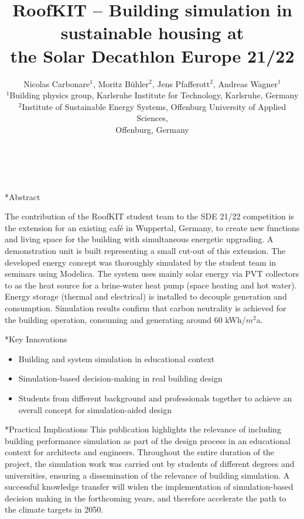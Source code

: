 \documentclass[twocolumn, a4paper,10pt]{article}
\title{%
RoofKIT – Building simulation in sustainable housing at \\%
\vspace{4pt}
the Solar Decathlon Europe 21/22} %
\author{%
Nicolas Carbonare$^1$, Moritz Bühler$^2$, Jens Pfafferott$^2$, Andreas Wagner$^1$\\ %
$^1$Building physics group, Karlsruhe Institute for Technology, Karlsruhe, Germany\\ %
$^2$Institute of Sustainable Energy Systems, Offenburg University of Applied Sciences,\\%
Offenburg, Germany\\ %
\phantom{Line 8}\\ %
\phantom{Line 9}\\} %
\date{\vspace{-0.5cm}}	%
\makeatletter
\renewcommand\section{\@startsection{section}{1}{\z@}{3pt}{3pt}{\normalfont\large\bfseries}}
\makeatother
\begin{document}
\maketitle
\section*{Abstract}	%
\addtocounter{section}{1}
The contribution of the RoofKIT student team to the SDE 21/22 competition is the extension for an existing café in Wuppertal, Germany, to create new functions and living space for the building with simultaneous energetic upgrading. A demonstration unit is built representing a small cut-out of this extension. The developed energy concept was thoroughly simulated by the student team in seminars using Modelica. The system uses mainly solar energy via PVT collectors to as the heat source for a brine-water heat pump (space heating and hot water). Energy storage (thermal and electrical) is installed to decouple generation and consumption. Simulation results confirm that carbon neutrality is achieved for the building operation, consuming and generating around 60 kWh/$m^2$a.

\section*{Key Innovations}
\begin{itemize}
\item Building and system simulation in educational context
\item Simulation-based decision-making in real building design
\item Students from different background and professionals together to achieve an overall concept for simulation-aided design
\end{itemize}

\section*{Practical Implications}
This publication highlights the relevance of including building performance simulation as part of the design process in an educational context for architects and engineers. Throughout the entire duration of the project, the simulation work was carried out by students of different degrees and universities, ensuring a dissemination of the relevance of building simulation. A successful knowledge transfer will widen the implementation of simulation-based decision making in the forthcoming years, and therefore accelerate the path to the climate targets in 2050.  
\end{document}
